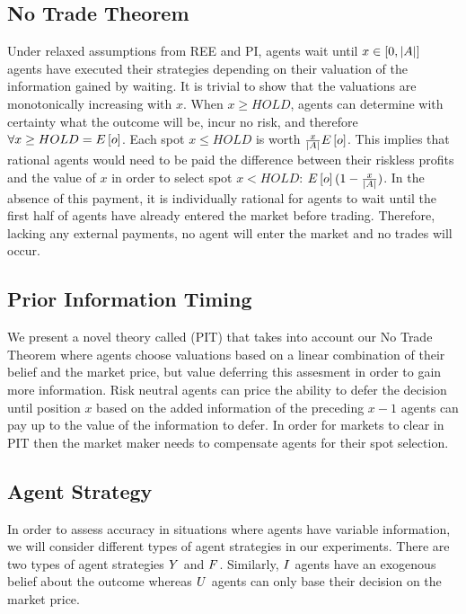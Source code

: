 \subsection{No Trade Theorem}
Under relaxed assumptions from REE and PI, agents wait until $x \in \left[0, |A| \right]$ agents have executed
their strategies depending on their valuation of the information gained by waiting. It is trivial to show that 
the valuations are monotonically increasing with $x$. When $x \geq HOLD$, agents can 
determine with certainty what the outcome will be, incur no risk, and therefore $\forall x \geq HOLD = E\left[o\right]$.
Each spot  $x \leq HOLD$ is worth $\frac{x}{|A|} 
E\left[o\right]$. This implies that rational agents
would need to be paid the difference between their riskless profits and the value of $x$ in order to select spot $x < HOLD$: $E\left[o\right](1 - \frac{x}{|A|})$. In the absence of this payment, it is individually rational for agents to wait until the first half of agents have already entered the market before trading. Therefore, lacking any external payments, no agent will enter the market and no
trades will occur.

\subsection{Prior Information Timing}
We present a novel theory called  (PIT) that takes into account our No Trade
Theorem where agents choose valuations based on a linear combination of their belief and the market
price, but value deferring this assesment in order to gain more information. Risk neutral agents can
price the ability to defer the decision until position $x$ based on the added information of the 
preceding $x-1$ agents can pay up to the value of the information to defer. In order for markets
to clear in PIT then the market maker needs to compensate agents for their spot selection.\\

\subsection{Agent Strategy}
In order to assess accuracy in situations where agents have variable information, we will consider different types of agent strategies in our experiments. There are two types of agent strategies  $Y$ and  $F$. Similarly,  $I$ agents have an exogenous belief about the outcome whereas  $U$ agents can only base their decision on the market price. \\


